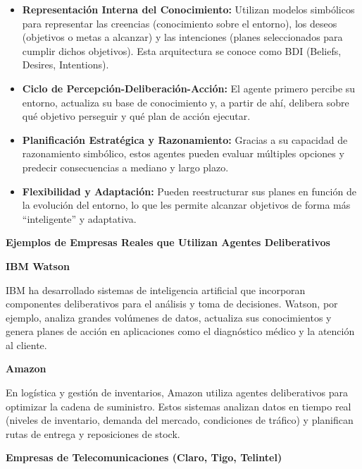 \documentclass[14pt]{extarticle}
\begin{document}
  \begin{itemize}
    \item \textbf{Representación Interna del Conocimiento:} Utilizan modelos simbólicos para representar las creencias (conocimiento sobre el entorno), los deseos (objetivos o metas a alcanzar) y las intenciones (planes seleccionados para cumplir dichos objetivos). Esta arquitectura se conoce como BDI (Beliefs, Desires, Intentions).
    \item \textbf{Ciclo de Percepción-Deliberación-Acción:} El agente primero percibe su entorno, actualiza su base de conocimiento y, a partir de ahí, delibera sobre qué objetivo perseguir y qué plan de acción ejecutar.
    \item \textbf{Planificación Estratégica y Razonamiento:} Gracias a su capacidad de razonamiento simbólico, estos agentes pueden evaluar múltiples opciones y predecir consecuencias a mediano y largo plazo.
    \item \textbf{Flexibilidad y Adaptación:} Pueden reestructurar sus planes en función de la evolución del entorno, lo que les permite alcanzar objetivos de forma más “inteligente” y adaptativa.
  \end{itemize}

  \vspace{1cm}
  {\large \textbf{Ejemplos de Empresas Reales que Utilizan Agentes Deliberativos}}

  \vspace{0.7cm}
  \textbf{IBM Watson}

  \vspace{0.3cm}
  IBM ha desarrollado sistemas de inteligencia artificial que incorporan componentes deliberativos para el análisis y toma de decisiones. Watson, por ejemplo, analiza grandes volúmenes de datos, actualiza sus conocimientos y genera planes de acción en aplicaciones como el diagnóstico médico y la atención al cliente.

  \vspace{1.1cm}
  \textbf{Amazon}

  \vspace{0.3cm}
  En logística y gestión de inventarios, Amazon utiliza agentes deliberativos para optimizar la cadena de suministro. Estos sistemas analizan datos en tiempo real (niveles de inventario, demanda del mercado, condiciones de tráfico) y planifican rutas de entrega y reposiciones de stock.

  \vspace{0.7cm}
  \textbf{Empresas de Telecomunicaciones (Claro, Tigo, Telintel)}
\end{document}
